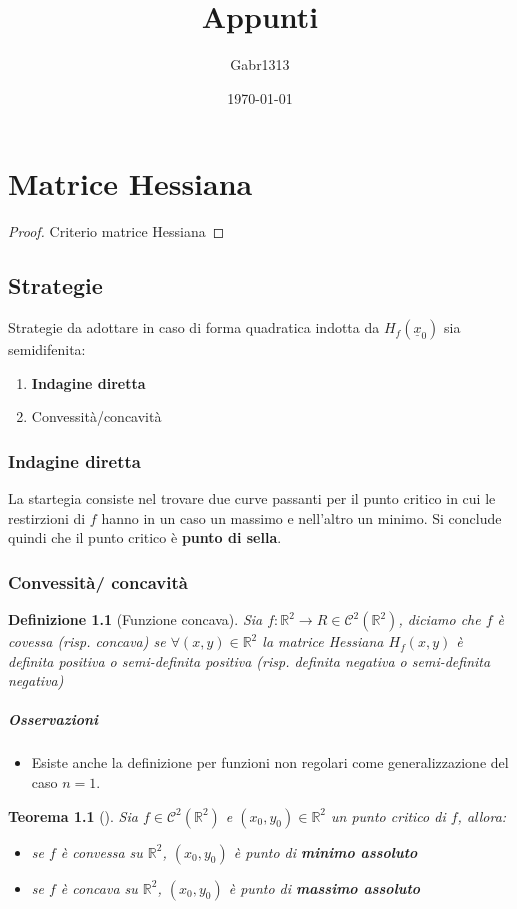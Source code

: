 \documentclass[12pt, a4paper]{report}
\title{Appunti}
\author{Gabr1313}
\date{\today}
\newtheorem{definition}{Definizione}
\newtheorem{theorem}{Teorema}
\begin{document}
\justify

\maketitle
\tableofcontents

\chapter{Matrice Hessiana}
\begin{proof}
	Criterio matrice Hessiana
\end{proof}

\section{Strategie}
Strategie da adottare in caso di forma quadratica indotta da
$H_f(\underline{x}_0)$ sia semidifenita:
\begin{enumerate}
	\item \textbf{Indagine diretta}
	\item Convessità/concavità
\end{enumerate}
\subsection{Indagine diretta}
La startegia consiste nel trovare due curve passanti per il punto critico in cui
le restirzioni di $f$ hanno in un caso un massimo e nell'altro un minimo. Si
conclude quindi che il punto critico è \textbf{punto di sella}.
\subsection{Convessità/ concavità}
\begin{definition}[Funzione concava]
	Sia $f : \mathbb{R}^2 \to R \in \mathcal{C}^2(\mathbb{R}^2)$,
	diciamo che $f$ è covessa (risp. concava) se $\forall (x,y) \in
		\mathbb{R}^2$ la matrice Hessiana $H_f(x,y)$ è definita positiva o
	semi-definita positiva (risp. definita negativa o semi-definita negativa)
\end{definition}
\paragraph{Osservazioni}
\begin{itemize}
	\item Esiste anche la definizione per funzioni non regolari come
	      generalizzazione del caso $n = 1$.
\end{itemize}
\begin{theorem}[]
	Sia $f \in \mathcal{C}^2(\mathbb{R}^2)$ e $(x_0, y_0) \in \mathbb{R}^2$
	un punto critico di $f$, allora:
	\begin{itemize}
		\item se $f$ è convessa su $\mathbb{R}^2$, $(x_0, y_0)$ è punto
		      di \textbf{minimo assoluto}
		\item se $f$ è concava su $\mathbb{R}^2$, $(x_0, y_0)$ è punto
		      di \textbf{massimo assoluto}
	\end{itemize}
\end{theorem}
\end{document}
